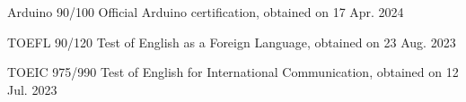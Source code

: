 

\begin{cvskills}

  \cvskill
  {Arduino 90/100} %
  {Official Arduino certification, obtained on 17 Apr. 2024} %

  \cvskill
  {TOEFL 90/120} %
  {Test of English as a Foreign Language, obtained on 23 Aug. 2023} %

  \cvskill
  {TOEIC 975/990} %
  {Test of English for International Communication, obtained on 12 Jul. 2023} %

\end{cvskills}
